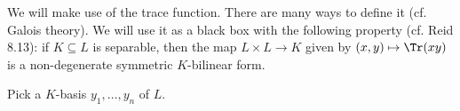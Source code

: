 We will make use of the trace function. There are many ways to define it
(cf. Galois theory). We will use it as a black box with the following
property (cf. Reid 8.13): if $K \subseteq L$ is separable, then the map
$L\times L\to K$ given by $(x, y)\mapsto \Tr(xy)$ is a non-degenerate
symmetric $K$-bilinear form.

Pick a $K$-basis $y_1, \ldots, y_n$ of $L$.
